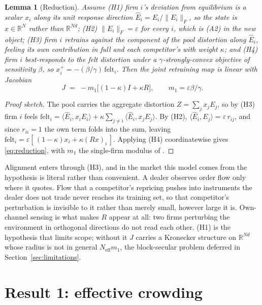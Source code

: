 \documentclass{article}
\theoremstyle{plain}
\newtheorem{lemma}[theorem]{Lemma}
\theoremstyle{definition}
\newcommand{\Neff}{N_{\mathrm{eff}}}
\begin{document}
\begin{lemma}[Reduction]
\label{lem:reduction}
Assume \textup{(H1)} firm $i$'s deviation from equilibrium is a scalar $x_i$ along its unit response direction $\hat{E}_i = E_i/\|E_i\|_F$, so the state is $x \in \mathbb{R}^N$ rather than $\mathbb{R}^{Nd}$; \textup{(H2)} $\|E_i\|_F = \varepsilon$ for every $i$, which is \textup{(A2)} in the new object; \textup{(H3)} firm $i$ retrains against the component of the pool distortion along $\hat{E}_i$, feeling its own contribution in full and each competitor's with weight $\kappa$; and \textup{(H4)} firm $i$ best-responds to the felt distortion under a $\gamma$-strongly-convex objective of sensitivity $\beta$, so $x_i^{+} = -(\beta/\gamma)\,\mathrm{felt}_i$. Then the joint retraining map is linear with Jacobian
\begin{equation}
\label{eq:reduction}
J \;=\; -m_1\bigl[(1-\kappa)I + \kappa R\bigr], \qquad m_1 = \varepsilon\beta/\gamma .
\end{equation}
\end{lemma}

\begin{proof}[Proof sketch]
The pool carries the aggregate distortion $Z = \sum_j x_j E_j$, so by (H3) firm $i$ feels $\mathrm{felt}_i = \langle \hat{E}_i, x_i E_i\rangle + \kappa\sum_{j\neq i}\langle \hat{E}_i, x_j E_j\rangle$. By (H2), $\langle \hat{E}_i, E_j\rangle = \varepsilon\, r_{ij}$, and since $r_{ii}=1$ the own term folds into the sum, leaving $\mathrm{felt}_i = \varepsilon[\,(1-\kappa)x_i + \kappa (Rx)_i\,]$. Applying (H4) coordinatewise gives \eqref{eq:reduction}, with $m_1$ the single-firm modulus of \citet{perdomo2020}.
\end{proof}

Alignment enters through (H3), and in the market this model comes from the hypothesis is literal rather than convenient. A dealer observes order flow only where it quotes. Flow that a competitor's repricing pushes into instruments the dealer does not trade never reaches its training set, so that competitor's perturbation is invisible to it rather than merely small, however large it is. Own-channel sensing is what makes $R$ appear at all: two firms perturbing the environment in orthogonal directions do not read each other. (H1) is the hypothesis that limits scope; without it $J$ carries a Kronecker structure on $\mathbb{R}^{Nd}$ whose radius is not in general $\Neff m_1$, the block-secular problem deferred in Section~\ref{sec:limitations}.

\section{Result 1: effective crowding}
\label{sec:alignment}
\end{document}
